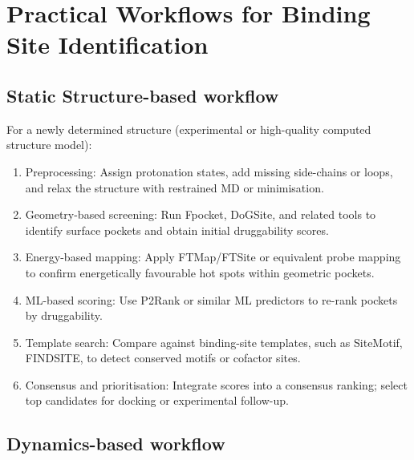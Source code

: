 \documentclass[12pt]{article}
\begin{document}
\section{Practical Workflows for Binding Site Identification}

\subsection{Static Structure-based workflow}

For a newly determined structure (experimental or high-quality computed structure model):
\begin{enumerate}
    \item Preprocessing: Assign protonation states, add missing side-chains or loops, and relax the structure with restrained MD or minimisation.
    \item Geometry-based screening: Run Fpocket, DoGSite, and related tools to identify surface pockets and obtain initial druggability scores.
    \item Energy-based mapping: Apply FTMap/FTSite or equivalent probe mapping to confirm energetically favourable hot spots within geometric pockets.
    \item ML-based scoring: Use P2Rank or similar ML predictors to re-rank pockets by druggability.
    \item Template search: Compare against binding-site templates, such as SiteMotif, FINDSITE, to detect conserved motifs or cofactor sites.
    \item Consensus and prioritisation: Integrate scores into a consensus ranking; select top candidates for docking or experimental follow-up.
\end{enumerate}

\subsection{Dynamics-based workflow}
\end{document}
